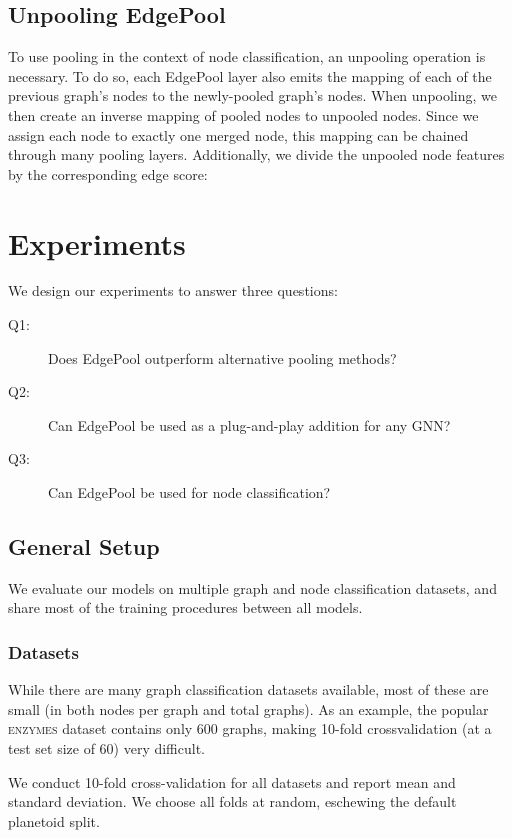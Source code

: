 \documentclass{article}
\newcommand{\edgepool}{EdgePool}
\newcommand{\datasetname}[1]{\textsc{#1}}
\newcommand{\enzymes}{\datasetname{enzymes}}
\begin{document}
\subsection{Unpooling \edgepool{}}

To use pooling in the context of node classification, an unpooling operation is necessary. To do so, each \edgepool{} layer also emits the mapping of each of the previous graph's nodes to the newly-pooled graph's nodes. When unpooling, we then create an inverse mapping of pooled nodes to unpooled nodes. Since we assign each node to exactly one merged node, this mapping can be chained through many pooling layers. Additionally, we divide the unpooled node features by the corresponding edge score:

 
\section{Experiments}
\label{sec:experiments}

We design our experiments to answer three questions:

\begin{description}
	\item[Q1:] Does \edgepool{} outperform alternative pooling methods?
	\item[Q2:] Can \edgepool{} be used as a plug-and-play addition for any \gls{GNN}?
	\item[Q3:] Can \edgepool{} be used for node classification?
\end{description}

\subsection{General Setup}

We evaluate our models on multiple graph and node classification datasets, and share most of the training procedures between all models.

\subsubsection{Datasets}

While there are many graph classification datasets available, most of these are small (in both nodes per graph and total graphs). As an example, the popular \enzymes{} dataset contains only 600 graphs, making 10-fold crossvalidation (at a test set size of 60) very difficult.

We conduct 10-fold cross-validation for all datasets and report mean and standard deviation. We choose all folds at random, eschewing the default planetoid split.
\end{document}
